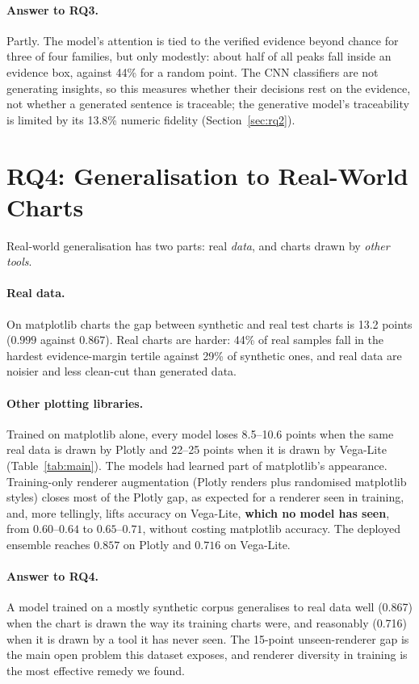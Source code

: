 \paragraph{Answer to RQ3.} Partly. The model's attention is tied to the verified evidence
beyond chance for three of four families, but only modestly: about half of all peaks fall
inside an evidence box, against 44\% for a random point. The CNN classifiers are not
generating insights, so this measures whether their decisions rest on the evidence, not
whether a generated sentence is traceable; the generative model's traceability is limited
by its 13.8\% numeric fidelity (Section~\ref{sec:rq2}).

\section{RQ4: Generalisation to Real-World Charts}
\label{sec:rq4}

Real-world generalisation has two parts: real \emph{data}, and charts drawn by
\emph{other tools}.

\paragraph{Real data.} On matplotlib charts the gap between synthetic and real test
charts is 13.2 points ($0.999$ against $0.867$). Real charts are harder: 44\% of real
samples fall in the hardest evidence-margin tertile against 29\% of synthetic ones, and
real data are noisier and less clean-cut than generated data.

\paragraph{Other plotting libraries.} Trained on matplotlib alone, every model loses
8.5--10.6 points when the same real data is drawn by Plotly and 22--25 points when it
is drawn by Vega-Lite (Table~\ref{tab:main}). The models had learned part of matplotlib's
appearance. Training-only renderer augmentation (Plotly renders plus randomised
matplotlib styles) closes most of the Plotly gap, as expected for a renderer seen in
training, and, more tellingly, lifts accuracy on Vega-Lite, \textbf{which no model has
seen}, from $0.60$--$0.64$ to $0.65$--$0.71$, without costing matplotlib accuracy. The
deployed ensemble reaches $0.857$ on Plotly and $0.716$ on Vega-Lite.

\paragraph{Answer to RQ4.} A model trained on a mostly synthetic corpus generalises to
real data well (0.867) when the chart is drawn the way its training charts were, and
reasonably (0.716) when it is drawn by a tool it has never seen. The 15-point
unseen-renderer gap is the main open problem this dataset exposes, and renderer
diversity in training is the most effective remedy we found.

